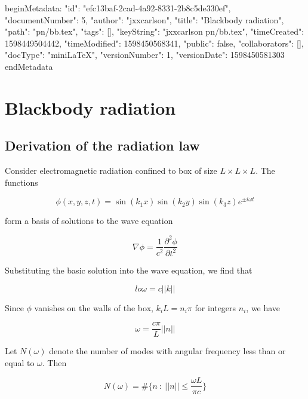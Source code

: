 beginMetadata:
{
    "id": "efc13baf-2cad-4a92-8331-2b8c5de330ef",
    "documentNumber": 5,
    "author": "jxxcarlson",
    "title": "Blackbody radiation",
    "path": "pn/bb.tex",
    "tags": [],
    "keyString": "jxxcarlson pn/bb.tex",
    "timeCreated": 1598449504442,
    "timeModified": 1598450568341,
    "public": false,
    "collaborators": [],
    "docType": "miniLaTeX",
    "versionNumber": 1,
    "versionDate": 1598450581303
}
endMetadata


\section{Blackbody radiation}

\innertableofcontents


\subsection{Derivation of the radiation law}

Consider electromagnetic radiation confined to box of size $L\times L \times L$. The functions

\begin{equation}
\phi(x,y,z,t) = \sin(k_1x)\sin(k_2y)\sin(k_3z)e^{\pm i\omega t}
\end{equation}

form a basis of solutions to the wave equation

\begin{equation}
\nabla \phi = \frac{1}{c^2} \frac{\partial^2 \phi}{\partial t^2}
\end{equation}

Substituting the basic solution into the wave equation, we find that

\begin{equation}lo
\omega = c||k||
\end{equation}

Since $\phi$ vanishes on the walls of the box, $k_iL = n_i\pi$ for
integers $n_i$, we have

\begin{equation}
\omega = \frac{c\pi}{L} ||n||
\end{equation}

Let $N(\omega)$ denote the number of modes with angular frequency less than or equal to $\omega$.  Then


\begin{equation}
N(\omega) = \#\Big\{ n\ :\ ||n|| \le \frac{\omega L}{\pi c} \Big\}
\end{equation}


